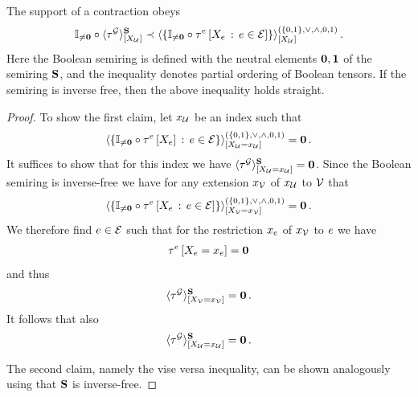 \begin{lemma}\label{lem:supportDecompositionGeneric}
    The support of a contraction obeys
    \begin{align*}
        \mathbb{I}_{\neq\mathbf{0}}\circ\langle\tau^{\mathcal{G}}\rangle^{\mathbf{S}}_{[X_{\mathcal{U}}]}
        \prec \langle
            \{\mathbb{I}_{\neq\mathbf{0}}\circ\tau^{e}\left[X_{e} \,:\, e\in\mathcal{E}\right]\}
        \rangle^{(\{0,1\},\lor,\land,0,1)}_{[X_{\mathcal{U}}]} \, .
    \end{align*}
    Here the Boolean semiring is defined with the neutral elements $\mathbf{0},\mathbf{1}$ of the semiring $\mathbf{S}$, and the inequality denotes partial ordering of Boolean tensors.
    If the semiring is inverse free, then the above inequality holds straight.
\end{lemma}
\begin{proof}
    To show the first claim, let $x_{\mathcal{U}}$ be an index such that
    \begin{align*}
        \langle
            \{\mathbb{I}_{\neq\mathbf{0}}\circ\tau^{e}\left[X_{e}\right] \,:\, e\in\mathcal{E}\}
        \rangle^{(\{0,1\},\lor,\land,0,1)}_{[X_{\mathcal{U}}=x_{\mathcal{U}}]}
        = \mathbf{0} \, .
    \end{align*}
    It suffices to show that for this index we have $\langle\tau^{\mathcal{G}}\rangle^{\mathbf{S}}_{[X_{\mathcal{U}}=x_{\mathcal{U}}]}=\mathbf{0}$.
    Since the Boolean semiring is inverse-free we have for any extension $x_{\mathcal{V}}$ of $x_{\mathcal{U}}$ to $\mathcal{V}$ that
    \begin{align*}
        \langle
            \{\mathbb{I}_{\neq\mathbf{0}}\circ\tau^{e}\left[X_{e} \,:\, e\in\mathcal{E}\right]\}
        \rangle^{(\{0,1\},\lor,\land,0,1)}_{[X_{\mathcal{V}}=x_{\mathcal{V}}]}
        = \mathbf{0} \, .
    \end{align*}
    We therefore find $e\in\mathcal{E}$ such that for the restriction $x_{e}$ of $x_{\mathcal{V}}$ to $e$ we have
    \begin{align*}
        \tau^{e}\left[X_{e}=x_{e}\right]
        = \mathbf{0}
    \end{align*}
    and thus
    \begin{align*}
        \langle\tau^{\mathcal{G}}\rangle^{\mathbf{S}}_{[X_{\mathcal{V}}=x_{\mathcal{V}}]}
        = \mathbf{0} \, .
    \end{align*}
    It follows that also
    \begin{align*}
        \langle\tau^{\mathcal{G}}\rangle^{\mathbf{S}}_{[X_{\mathcal{U}}=x_{\mathcal{U}}]}
        = \mathbf{0} \, .
    \end{align*}

    The second claim, namely the vise versa inequality, can be shown analogously using that $\mathbf{S}$ is inverse-free.
\end{proof}

